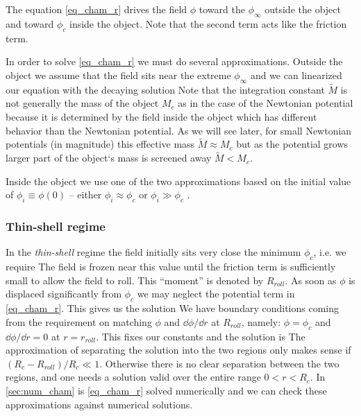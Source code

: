 The equation \eqref{eq_cham_r} drives the field $\phi$ toward the $\phi_\infty$ outside the object and toward $\phi_c$ inside the object. Note that the second term acts like the friction term.

In order to solve \eqref{eq_cham_r} we must do several approximations. Outside the object we assume that the field sits near the extreme $\phi_\infty$ and we can linearized our equation
with the decaying solution
Note that the integration constant $\tilde{M}$ is not generally the mass of the object $M_c$ as in the case of the Newtonian potential because it is determined by the field inside the object which has different behavior than the Newtonian potential. As we will see later, for small Newtonian potentials (in magnitude) this effective mass $\tilde{M}\approx M_c$ but as the potential grows larger part of the object`s mass is screened away $\tilde{M}< M_c$.

Inside the object we use one of the two approximations based on the initial value of $\phi_i\equiv\phi(0)$ -- either $\phi_i\approx\phi_c$ or $\phi_i\gg\phi_c$ .
\subsubsection{Thin-shell regime}
In the \textit{thin-shell} regime the field initially sits very close the minimum $\phi_c$, i.e. we require
The field is frozen near this value until the friction term is sufficiently small to allow the field to roll. This ``moment'' is denoted by $R_{roll}$. As soon as $\phi$ is displaced significantly from $\phi_c$ we may neglect the potential term in \eqref{eq_cham_r}. This gives us the solution
We have boundary conditions coming from the requirement on matching $\phi$ and  $\dd\phi/\dd r$ at $R_{roll}$, namely: $\phi=\phi_c$ and $\dd\phi/\dd r=0$ at $r=r_{roll}$. This fixes our constants and the solution is
The approximation of separating the solution into the two regions only makes sense if $(R_c-R_{roll})/R_c\ll1$. Otherwise there is no clear separation between the two regions, and one needs a solution valid over the entire range $0<r<R_c$. In \autoref{sec:num_cham} is \eqref{eq_cham_r} solved numerically and we can check these approximations against numerical solutions.

